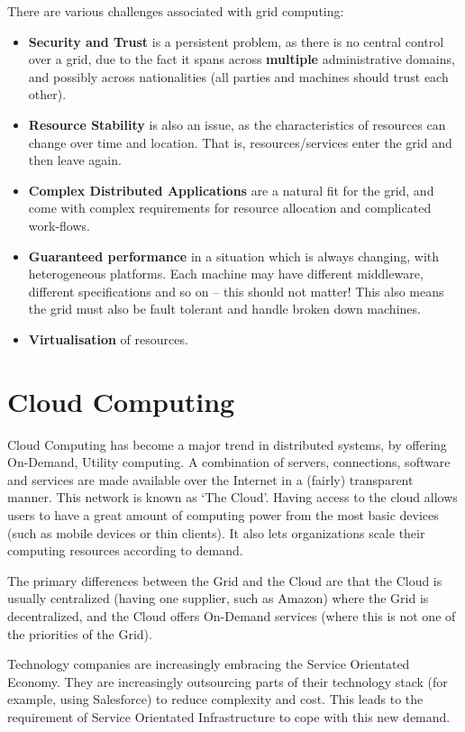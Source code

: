 \documentclass{article}
\begin{document}
There are various challenges associated with grid computing:
\begin{itemize}
	\item \textbf{Security and Trust} is a persistent problem, as there is no central control over a grid, due to the fact it spans across \textbf{multiple} administrative domains, and possibly across nationalities (all parties and machines should trust each other).
	\item \textbf{Resource Stability} is also an issue, as the characteristics of resources can change over time and location. That is, resources/services enter the grid and then leave again.
	\item \textbf{Complex Distributed Applications} are a natural fit for the grid, and come with complex requirements for resource allocation and complicated work-flows.
	\item \textbf{Guaranteed performance} in a situation which is always changing, with heterogeneous platforms. Each machine may have different middleware, different specifications and so on -- this should not matter! This also means the grid must also be fault tolerant and handle broken down machines.
	\item \textbf{Virtualisation} of resources.
\end{itemize}



\section{Cloud Computing}
Cloud Computing has become a major trend in distributed systems, by offering On-Demand, Utility computing. A combination of servers, connections, software and services are made available over the Internet in a (fairly) transparent manner. This network is known as `The Cloud'. Having access to the cloud allows users to have a great amount of computing power from the most basic devices (such as mobile devices or thin clients). It also lets organizations scale their computing resources according to demand.

The primary differences between the Grid and the Cloud are that the Cloud is usually centralized (having one supplier, such as Amazon) where the Grid is decentralized, and the Cloud offers On-Demand services (where this is not one of the priorities of the Grid).

Technology companies are increasingly embracing the Service Orientated Economy. They are increasingly outsourcing parts of their technology stack (for example, using Salesforce) to reduce complexity and cost. This leads to the requirement of Service Orientated Infrastructure to cope with this new demand.
\end{document}
